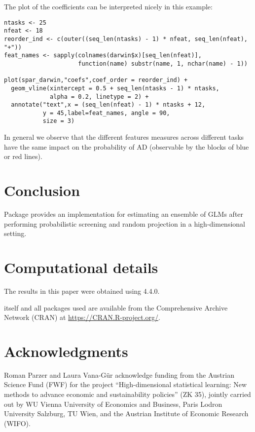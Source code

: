 \documentclass[
  article]{jss}
\begin{document}
The plot of the coefficients can be interpreted nicely in this example:

\begin{verbatim}
ntasks <- 25
nfeat <- 18
reorder_ind <- c(outer((seq_len(ntasks) - 1) * nfeat, seq_len(nfeat), "+"))
feat_names <- sapply(colnames(darwin$x)[seq_len(nfeat)],
                     function(name) substr(name, 1, nchar(name) - 1))

plot(spar_darwin,"coefs",coef_order = reorder_ind) + 
  geom_vline(xintercept = 0.5 + seq_len(ntasks - 1) * ntasks, 
             alpha = 0.2, linetype = 2) +
  annotate("text",x = (seq_len(nfeat) - 1) * ntasks + 12,
           y = 45,label=feat_names, angle = 90,
           size = 3)
\end{verbatim}

In general we observe that the different features measures across
different tasks have the same impact on the probability of AD
(observable by the blocks of blue or red lines).

\section{Conclusion}\label{sec-conclusion}

Package  provides an implementation for estimating an ensemble
of GLMs after performing probabilistic screening and random projection
in a high-dimensional setting.

\section*{Computational details}\label{computational-details}

The results in this paper were obtained using  4.4.0.

 itself and all packages used are available from the
Comprehensive  Archive Network (CRAN) at
\url{https://CRAN.R-project.org/}.

\section*{Acknowledgments}\label{acknowledgments}

Roman Parzer and Laura Vana-Gür acknowledge funding from the Austrian
Science Fund (FWF) for the project ``High-dimensional statistical
learning: New methods to advance economic and sustainability policies''
(ZK 35), jointly carried out by WU Vienna University of Economics and
Business, Paris Lodron University Salzburg, TU Wien, and the Austrian
Institute of Economic Research (WIFO).


\renewcommand\refname{References}
  
\end{document}
